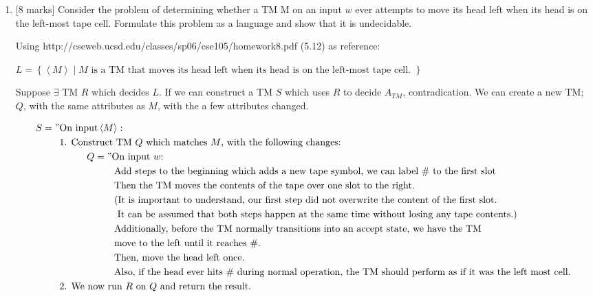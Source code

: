 \documentclass{article}
\newcommand{\set}[1]{{\left\{#1\right\}}}    %
\newcommand{\enc}[1]{\left<#1\right>}
\newcommand\tab[1][1cm]{\hspace*{#1}}
\begin{document}
\begin{enumerate}
\begin{enumerate}
        	\item {[8 marks]} Consider the problem of determining whether a TM M on an input $w$ ever attempts to move its head left when its head is on the left-most tape cell. Formulate this problem as a language and show that it is undecidable.

            	Using http://cseweb.ucsd.edu/classes/sp06/cse105/homework8.pdf (5.12) as reference:

            		$L=\set{\enc{M}\mid M\text{ is a TM that moves its head left when its head is on the left-most tape cell. }}$

                    Suppose $\exists$ TM $R$ which decides $L$.
                    If we can construct a TM $S$ which uses $R$ to decide $A_{TM}$, contradication.
                    We can create a new TM; $Q$, with the same attributes as $M$, with the a few attributes changed.

                    \begin{equation}
                        \begin{split}
                           S = "& \text{On input} \enc{M}: \\
                                & \text{1. Construct TM $Q$ which matches $M$, with the following changes:} \\
                                & \tab Q = "\text{On input $w$:} \\
                                & \tab\tab \text{Add steps to the beginning which adds a new tape symbol, we can label $\#$ to the first slot} \\
                                & \tab\tab \text{Then the TM moves the contents of the tape over one slot to the right.} \\
                                & \tab\tab \text{(It is important to understand, our first step did not overwrite the content of the first slot.} \\
                                & \tab\tab \text{ It can be assumed that both steps happen at the same time without losing any tape contents.)} \\
                                & \tab\tab \text{Additionally, before the TM normally transitions into an accept state, we have the TM} \\
                                & \tab\tab \text{move to the left until it reaches $\#$.} \\
                                & \tab\tab \text{Then, move the head left once.} \\
                                & \tab\tab \text{Also, if the head ever hits $\#$ during normal operation, the TM should perform as if it was the left most cell.} \\
                                & \text{2. We now run $R$ on $Q$ and return the result.}
                        \end{split}
                    \end{equation}


\end{enumerate}
\end{enumerate}
\end{document}
